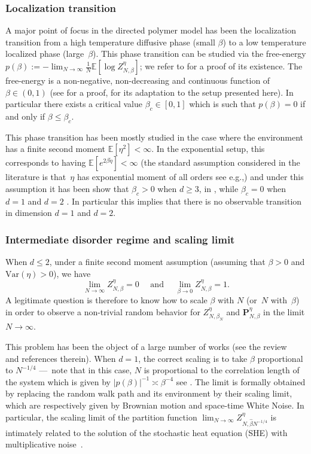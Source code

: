 \documentclass[11pt]{article}
\newcommand{\eg}{e.g.,\xspace}
\numberwithin{equation}{section}
\theoremstyle{definition}
\newcommand{\bP}{{\ensuremath{\mathbf P}} }
\newcommand{\Var}{\mathrm{Var}}
\newcommand{\bbE}{{\ensuremath{\mathbb E}} }
\let\gb\beta
\begin{document}
\subsubsection*{Localization transition}

A major point of focus in the directed polymer model has been the localization transition from a high temperature diffusive phase (small $\beta$) to a low temperature localized phase (large~$\beta$).
This phase transition can be studied via the free-energy $p(\beta):= -\lim_{N\to \infty}\frac{1}{N} \bbE [\log Z^{\eta}_{N,\beta}]$;
we refer to \cite[Prop.\,2.5]{CSY03} for a proof of its existence.
The free-energy is a non-negative, non-decreasing and continuous function of $\beta\in (0,1)$
(see \cite[Th.\,3.2]{CSY06} for a proof, \cite[Th.\,A.1]{Vi19} for its adaptation to the setup presented here). In particular there exists a critical value $\beta_c\in [0,1]$ which is such that $p(\gb)=0$ if and only if $\beta \leq \gb_c$.

This phase transition has been mostly studied in the case where the environment has a finite second moment
$\bbE[\eta^2]<\infty$. In the exponential setup, this corresponds to having $\bbE[e^{2\beta\tilde \eta}]<\infty$ (the standard assumption considered in the literature is that~$\eta$ has exponential moment of all orders see \eg \cite{AKQ10})
and under this assumption it has been show that $\beta_c>0$ when $d\ge 3$, in \cite{Bol89,IS88}, while $\beta_c=0$ when $d=1$ \cite{CV06} and $d=2$ \cite{Lac10pol}. In particular this implies that there is no observable transition in dimension $d=1$ and $d=2$.

\subsubsection*{Intermediate disorder regime and scaling limit}

When $d \le 2$, under a finite second moment assumption (assuming that $\beta>0$ and $\Var(\eta)>0$), we have
\begin{equation}%
\lim_{N \to \infty} Z^{\eta}_{N,\beta}= 0 \quad \text{ and } \quad
\lim_{\beta\to 0} Z^{\eta}_{N,\beta}=1.
\end{equation}
A legitimate question is therefore to know how
to scale $\beta$ with $N$ (or~$N$ with~$\beta$) in order to observe a non-trivial random behavior for $Z^{\eta}_{N,\beta_N}$ and $\bP^{\eta}_{N,\beta}$ in the limit $N\to\infty$.

This problem has been the object of a large number of works \cite{AKQ10, CSZ14, CSZ13} (see the review~\cite{CSZreview} and references therein). When $d=1$, the correct scaling is to take $\beta$ proportional to $N^{-1/4}$
---~note that in this case, $N$ is proportional to the correlation length of the system which is given by $|p(\beta)|^{-1}\asymp \beta^{-4}$ see \cite{AY15, Nak16}.
The limit is formally obtained by replacing the random walk path and its environment by their scaling limit, which are respectively given by Brownian motion and space-time White Noise.
In particular, the scaling limit of the partition function $\lim_{N\to \infty} Z^{\eta}_{N, \hat \beta N^{-1/4}}$ is intimately related to the solution of the stochastic heat equation (SHE) with multiplicative noise~\cite{CB95}.
\end{document}
